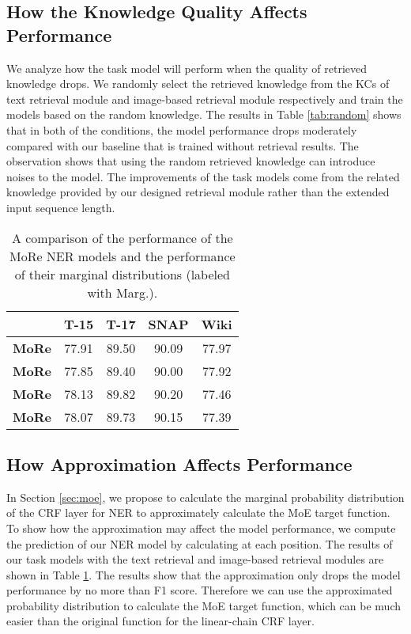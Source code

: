 \documentclass[11pt]{article}
\begin{document}
\subsection{How the Knowledge Quality Affects Performance}
We analyze how the task model will perform when the quality of retrieved knowledge drops. We randomly select the retrieved knowledge from the KCs of text retrieval module and image-based retrieval module respectively and train the models based on the random knowledge. The results in Table \ref{tab:random} shows that in both of the conditions, the model performance drops moderately compared with our baseline that is trained without retrieval results. The observation shows that using the random retrieved knowledge can introduce noises to the model. The improvements of the task models come from the related knowledge provided by our designed retrieval module rather than the extended input sequence length.




\begin{table}[t!]
\small
\centering
\begin{tabular}{l|cccc}
\toprule
& T-15 & T-17 & SNAP  & Wiki\\
\midrule
\textbf{MoRe}      & 77.91 & 89.50 & 90.09 & 77.97 \\
\textbf{MoRe} & 77.85 & 89.40 & 90.00 & 77.92 \\
\textbf{MoRe}       & 78.13 & 89.82 & 90.20 & 77.46 \\
\textbf{MoRe}  & 78.07 & 89.73 & 90.15 & 77.39 \\
\bottomrule
\end{tabular}
\caption{A comparison of the performance of the MoRe NER models and the performance of their marginal distributions (labeled with Marg.).}
\label{tab:marginal}
\end{table}

\subsection{How Approximation Affects Performance}
In Section \ref{sec:moe}, we propose to calculate the marginal probability distribution of the CRF layer for NER to approximately calculate the MoE target function. To show how the approximation may affect the model performance, we compute the prediction of our NER model by calculating  at each position. The results of our task models with the text retrieval and image-based retrieval modules are shown in Table \ref{tab:marginal}. The results show that the approximation only drops the model performance by no more than  F1 score. Therefore we can use the approximated probability distribution to calculate the MoE target function, which can be much easier than the original function for the linear-chain CRF layer.
\end{document}
